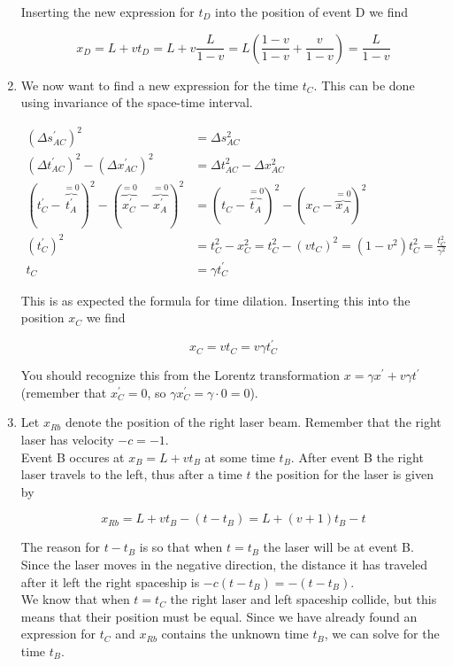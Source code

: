 \documentclass[a4paper,10pt,english]{article}
\begin{document}
\begin{enumerate}
Inserting the new expression for $t_{D}$ into the position of event D we find

\begin{equation*}
x_{D}=L+vt_{D}=L+v\frac{L}{1-v}=L\left(\frac{1-v}{1-v}+\frac{v}{1-v}\right)=\frac{L}{1-v}
\end{equation*}

\item We now want to find a new expression for the time $t_{C}$. This can be done using invariance of the space-time interval.

\begin{align*}
\left(\Delta s_{AC}^{\prime}\right)^{2}&=\Delta s_{AC}^{2}\\
\left(\Delta t_{AC}^{\prime}\right)^{2}-\left(\Delta x_{AC}^{\prime}\right)^{2}&=\Delta t_{AC}^{2}-\Delta x_{AC}^{2}\\
\left(t_{C}^{\prime}-\overbrace{t_{A}^{\prime}}^{=0}\right)^{2}-\left(\overbrace{x_{C}^{\prime}}^{=0}-\overbrace{x_{A}^{\prime}}^{=0}\right)^{2}&=\left(t_{C}-\overbrace{t_{A}}^{=0}\right)^{2}-\left(x_{C}-\overbrace{x_{A}}^{=0}\right)^{2}\\
\left(t_{C}^{\prime}\right)^{2}&=t_{C}^{2}-x_{C}^{2}=t_{C}^{2}-(vt_{C})^{2}=(1-v^{2})t_{C}^{2}=\frac{t_{C}^{2}}{\gamma^{2}}\\
t_{C}&=\gamma t_{C}^{\prime}
\end{align*}

This is as expected the formula for time dilation. Inserting this into the position $x_{C}$ we find

\begin{equation*}
x_{C}=vt_{C}=v\gamma t_{C}^{\prime}
\end{equation*}

You should recognize this from the Lorentz transformation $x=\gamma x^{\prime}+v\gamma t^{\prime}$ (remember that $x_{C}^{\prime}=0$, so $\gamma x_{C}^{\prime}=\gamma\cdot0=0$).
\item Let $x_{Rb}$ denote the position of the right laser beam. Remember that the right laser has velocity $-c=-1$. 
\\
Event B occures at $x_{B}=L+vt_{B}$ at some time $t_{B}$. After event B the right laser travels to the left, thus after a time $t$ the position for the laser is given by 

\begin{equation}\label{eq:right_laser}
x_{Rb}=L+vt_{B}-(t-t_{B})=L+(v+1)t_{B}-t
\end{equation}

The reason for $t-t_{B}$ is so that when $t=t_{B}$ the laser will be at event B. Since the laser moves in the negative direction, the distance it has traveled after it left the right spaceship is $-c(t-t_{B})=-(t-t_{B})$.
\\
We know that when $t=t_{C}$ the right laser and left spaceship collide, but this means that their position must be equal. Since we have already found an expression for $t_{C}$ and $x_{Rb}$ contains the unknown time $t_{B}$, we can solve for the time $t_{B}$.


\end{enumerate}
\end{document}

